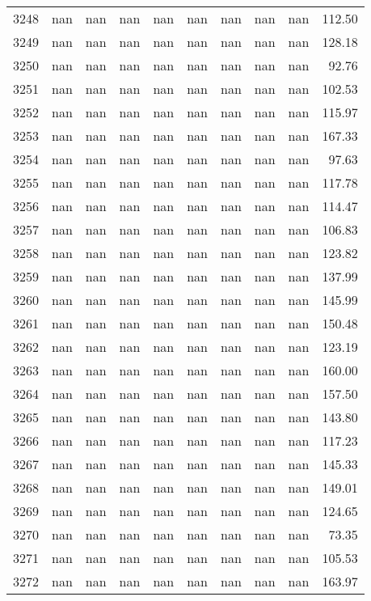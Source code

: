 \begin{tabular}{lrrrrrrrrr}
3248 & nan & nan & nan & nan & nan & nan & nan & nan & 112.50 \\
3249 & nan & nan & nan & nan & nan & nan & nan & nan & 128.18 \\
3250 & nan & nan & nan & nan & nan & nan & nan & nan & 92.76 \\
3251 & nan & nan & nan & nan & nan & nan & nan & nan & 102.53 \\
3252 & nan & nan & nan & nan & nan & nan & nan & nan & 115.97 \\
3253 & nan & nan & nan & nan & nan & nan & nan & nan & 167.33 \\
3254 & nan & nan & nan & nan & nan & nan & nan & nan & 97.63 \\
3255 & nan & nan & nan & nan & nan & nan & nan & nan & 117.78 \\
3256 & nan & nan & nan & nan & nan & nan & nan & nan & 114.47 \\
3257 & nan & nan & nan & nan & nan & nan & nan & nan & 106.83 \\
3258 & nan & nan & nan & nan & nan & nan & nan & nan & 123.82 \\
3259 & nan & nan & nan & nan & nan & nan & nan & nan & 137.99 \\
3260 & nan & nan & nan & nan & nan & nan & nan & nan & 145.99 \\
3261 & nan & nan & nan & nan & nan & nan & nan & nan & 150.48 \\
3262 & nan & nan & nan & nan & nan & nan & nan & nan & 123.19 \\
3263 & nan & nan & nan & nan & nan & nan & nan & nan & 160.00 \\
3264 & nan & nan & nan & nan & nan & nan & nan & nan & 157.50 \\
3265 & nan & nan & nan & nan & nan & nan & nan & nan & 143.80 \\
3266 & nan & nan & nan & nan & nan & nan & nan & nan & 117.23 \\
3267 & nan & nan & nan & nan & nan & nan & nan & nan & 145.33 \\
3268 & nan & nan & nan & nan & nan & nan & nan & nan & 149.01 \\
3269 & nan & nan & nan & nan & nan & nan & nan & nan & 124.65 \\
3270 & nan & nan & nan & nan & nan & nan & nan & nan & 73.35 \\
3271 & nan & nan & nan & nan & nan & nan & nan & nan & 105.53 \\
3272 & nan & nan & nan & nan & nan & nan & nan & nan & 163.97 \\

\end{tabular}
